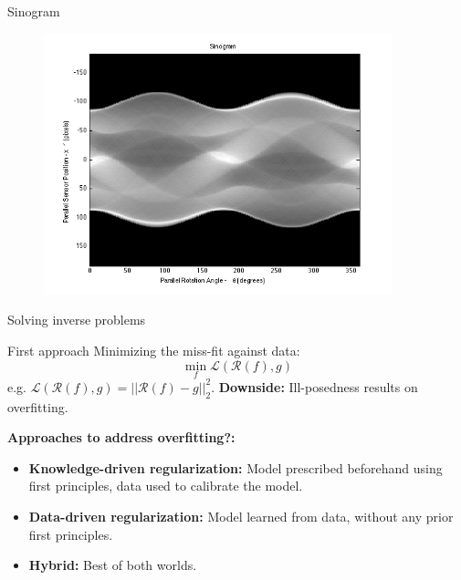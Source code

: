 \begin{frame}{Sinogram}
\begin{figure}[!tbp]
\includegraphics[width=0.9\textwidth]{../sinogram.png}
\end{figure}
\end{frame}

\begin{frame}{Solving inverse problems}
\begin{block}{First approach}
Minimizing the miss-fit against data:
$$
\min_{f} \mathcal{L}(\mathcal{R}(f),g)
$$
e.g. $\mathcal{L}(\mathcal{R}(f),g)=||\mathcal{R}(f)-g||_2^2$. \textbf{Downside:} Ill-posedness results on overfitting.
\end{block}

\bigskip
\pause

\textbf{Approaches to address overfitting?:}
\begin{itemize}
\item \textbf{Knowledge-driven regularization:} Model prescribed beforehand using first principles, data used to calibrate the model.
\item \textbf{Data-driven regularization:} Model learned from data, without any prior first principles.
\item \textbf{Hybrid:} Best of both worlds. 
\end{itemize}
\end{frame}


